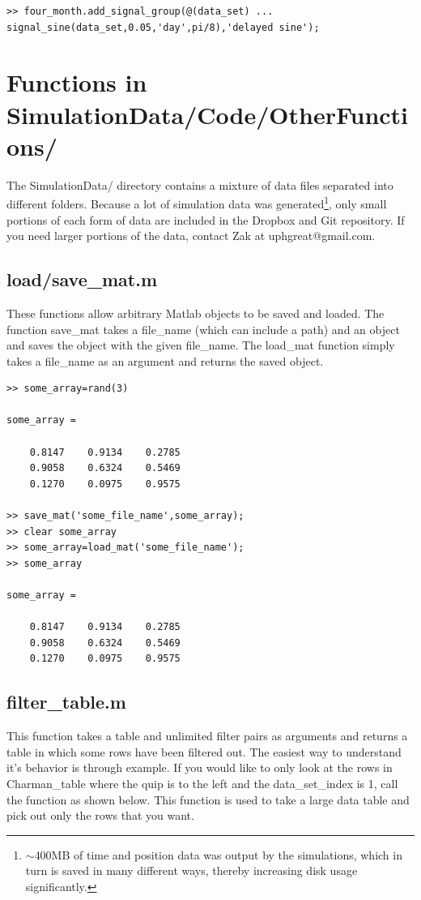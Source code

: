 \documentclass[12pt]{report}
\begin{document}
\begin{verbatim}
>> four_month.add_signal_group(@(data_set) ...
signal_sine(data_set,0.05,'day',pi/8),'delayed sine');
\end{verbatim}





\chapter{Functions in SimulationData/Code/OtherFunctions/}
The SimulationData/ directory contains a mixture of data files separated into different folders.  Because a lot of simulation data was generated\footnote{${\sim}$400MB of time and position data was output by the simulations, which in turn is saved in many different ways, thereby increasing disk usage significantly.}, only small portions of each form of data are included in the Dropbox and Git repository.  If you need larger portions of the data, contact Zak at uphgreat@gmail.com.

\section{load/save\_mat.m}
These functions allow arbitrary Matlab objects to be saved and loaded.  The function save\_mat takes a file\_name (which can include a path) and an object and saves the object with the given file\_name.  The load\_mat function simply takes a file\_name as an argument and returns the saved object.

\begin{verbatim}
>> some_array=rand(3)

some_array =

    0.8147    0.9134    0.2785
    0.9058    0.6324    0.5469
    0.1270    0.0975    0.9575

>> save_mat('some_file_name',some_array);
>> clear some_array
>> some_array=load_mat('some_file_name');
>> some_array

some_array =

    0.8147    0.9134    0.2785
    0.9058    0.6324    0.5469
    0.1270    0.0975    0.9575
\end{verbatim}

\section{filter\_table.m}
This function takes a table and unlimited filter pairs as arguments and returns a table in which some rows have been filtered out.  The easiest way to understand it's behavior is through example.  If you would like to only look at the rows in Charman\_table where the quip is to the left and the data\_set\_index is 1, call the function as shown below.  This function is used to take a large data table and pick out only the rows that you want.
\end{document}
